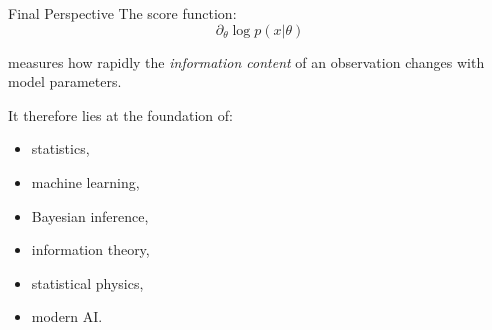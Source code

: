\documentclass{beamer}
\begin{document}
\begin{frame}{Final Perspective}
The score function:
\[
\partial_\theta \log p(x|\theta)
\]

measures how rapidly the \emph{information content} of an observation changes with model parameters.

\medskip

It therefore lies at the foundation of:
\begin{itemize}
\item statistics,
\item machine learning,
\item Bayesian inference,
\item information theory,
\item statistical physics,
\item modern AI.
\end{itemize}
\end{frame}

\end{document}

